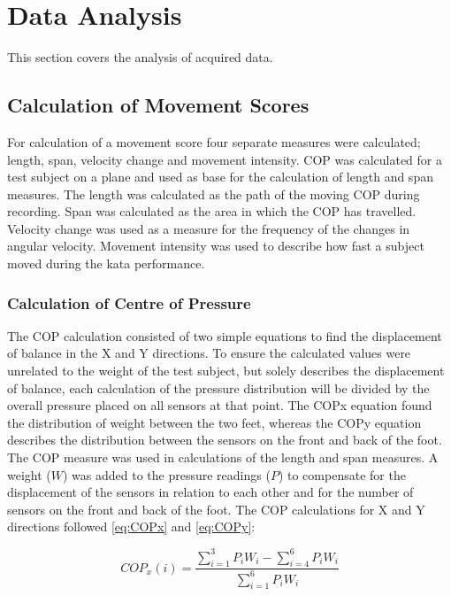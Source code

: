\section{Data Analysis}
This section covers the analysis of acquired data.

\subsection{Calculation of Movement Scores}

For calculation of a movement score four separate measures were calculated; length, span, velocity change and movement intensity. COP was calculated for a test subject on a plane and used as base for the calculation of length and span measures. The length was calculated as the path of the moving COP during recording. Span was calculated as the area in which the COP has travelled. Velocity change was used as a measure for the frequency of the changes in angular velocity. Movement intensity was used to describe how fast a subject moved during the kata performance. 

\subsubsection{Calculation of Centre of Pressure}
The COP calculation consisted of two simple equations to find the displacement of balance in the X and Y directions. To ensure the calculated values were unrelated to the weight of the test subject, but solely describes the displacement of balance, each calculation of the pressure distribution will be divided by the overall pressure placed on all sensors at that point. The COP\lowercase{x} equation found the distribution of weight between the two feet, whereas the COP\lowercase{y} equation describes the distribution between the sensors on the front and back of the foot. The COP measure was used in calculations of the length and span measures. A weight ($W$) was added to the pressure readings ($P$) to compensate  for the displacement of the sensors in relation to each other and for the number of sensors on the front and back of the foot.
The COP calculations for X and Y directions followed \eqref{eq:COPx} and \eqref{eq:COPy}:

\begin{equation} \label{eq:COPx}
COP_x(i) =  \frac{\sum_{i=1}^{3}P_i W_i - \sum_{i=4}^{6}P_i W_i}{\sum_{i=1}^{6}P_i W_i}
\end{equation} 

